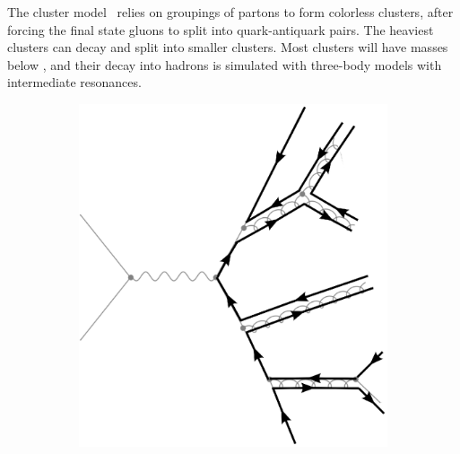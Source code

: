 The cluster model~\cite{Webber:1983if,Marchesini:1987cf} relies on groupings of partons to form colorless clusters, after forcing the final state gluons to split into quark-antiquark pairs. The heaviest clusters can decay and split into smaller clusters. Most clusters will have masses below \unit[3]{\gev}, and their decay into hadrons is simulated with three-body models with intermediate resonances.

\begin{figure}[!t]
  \begin{center}
    \begin{subfigure}{0.3\textwidth}
        \includegraphics[width=\textwidth]{MCsimulation/Figures/had_colorflow.eps}
        \caption{}\end{subfigure}
    \begin{subfigure}{0.3\textwidth}

\end{subfigure}
\end{center}
\end{figure}

